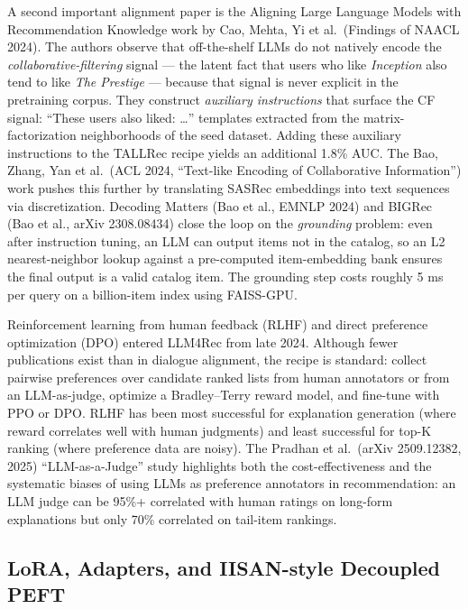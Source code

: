 A second important alignment paper is the Aligning Large Language Models with Recommendation Knowledge work by Cao, Mehta, Yi et al.~(Findings of NAACL 2024). The authors observe that off-the-shelf LLMs do not natively encode the \emph{collaborative-filtering} signal --- the latent fact that users who like \emph{Inception} also tend to like \emph{The Prestige} --- because that signal is never explicit in the pretraining corpus. They construct \emph{auxiliary instructions} that surface the CF signal: ``These users also liked: \ldots{}'' templates extracted from the matrix-factorization neighborhoods of the seed dataset. Adding these auxiliary instructions to the TALLRec recipe yields an additional 1.8\% AUC. The Bao, Zhang, Yan et al.~(ACL 2024, ``Text-like Encoding of Collaborative Information'') work pushes this further by translating SASRec embeddings into text sequences via discretization. Decoding Matters (Bao et al., EMNLP 2024) and BIGRec (Bao et al., arXiv 2308.08434) close the loop on the \emph{grounding} problem: even after instruction tuning, an LLM can output items not in the catalog, so an L2 nearest-neighbor lookup against a pre-computed item-embedding bank ensures the final output is a valid catalog item. The grounding step costs roughly 5 ms per query on a billion-item index using FAISS-GPU.

Reinforcement learning from human feedback (RLHF) and direct preference optimization (DPO) entered LLM4Rec from late 2024. Although fewer publications exist than in dialogue alignment, the recipe is standard: collect pairwise preferences over candidate ranked lists from human annotators or from an LLM-as-judge, optimize a Bradley--Terry reward model, and fine-tune with PPO or DPO. RLHF has been most successful for explanation generation (where reward correlates well with human judgments) and least successful for top-K ranking (where preference data are noisy). The Pradhan et al.~(arXiv 2509.12382, 2025) ``LLM-as-a-Judge'' study highlights both the cost-effectiveness and the systematic biases of using LLMs as preference annotators in recommendation: an LLM judge can be 95\%+ correlated with human ratings on long-form explanations but only 70\% correlated on tail-item rankings.

\subsection{LoRA, Adapters, and IISAN-style Decoupled PEFT}\label{lora-adapters-and-iisan-style-decoupled-peft}

